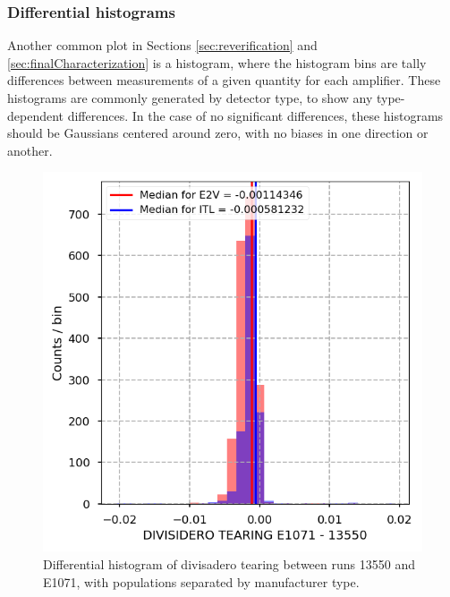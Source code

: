 \clearpage
\subsubsection{Differential histograms}

Another common plot in Sections \ref{sec:reverification} and \ref{sec:finalCharacterization} is a histogram, where the histogram bins are tally differences between measurements of a given quantity for each amplifier. These histograms are commonly generated by detector type, to show any type-dependent differences. In the case of no significant differences, these histograms should be Gaussians centered around zero, with no biases in one direction or another. %

\begin{figure}
    \centering
    \includegraphics[width=0.8\linewidth]{figures/baselineCharacterization/DIVISIDERO_TEARING_13550_E1071_diff.png}
    \caption{Differential histogram of divisadero tearing between runs 13550 and E1071, with populations separated by manufacturer type.}
    \label{fig:ref:histDiff}
\end{figure}

\clearpage

